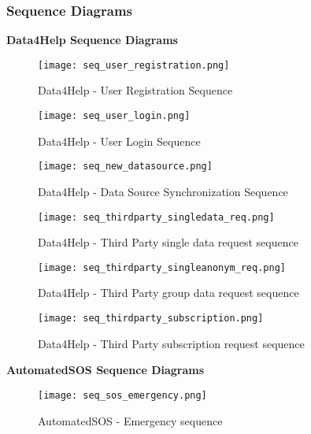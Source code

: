 \graphicspath{ {../Diagrams/} }


\subsubsection{Sequence Diagrams}
\textbf{Data4Help Sequence Diagrams}
\begin{figure}[H]
	\texttt{[image: seq\_user\_registration.png]}
	\caption{Data4Help - User Registration Sequence}
	\label{Data4Help - User Registration Sequence}
\end{figure}

\begin{figure}
	\texttt{[image: seq\_user\_login.png]}
	\caption{Data4Help - User Login Sequence}
	\label{Data4Help - User Login Sequence}
\end{figure}

\begin{figure}
	\texttt{[image: seq\_new\_datasource.png]}
	\caption{Data4Help - Data Source Synchronization Sequence}
	\label{Data4Help - Data Source Synchronization Sequence}
\end{figure}                                           

\begin{figure}
	\texttt{[image: seq\_thirdparty\_singledata\_req.png]}
	\caption{Data4Help - Third Party single data request sequence}
	\label{Data4Help - Third Party single data request sequence}
\end{figure}

\begin{figure}
	\texttt{[image: seq\_thirdparty\_singleanonym\_req.png]}
	\caption{Data4Help - Third Party group data request sequence}
	\label{Data4Help - Third Party group data request sequence}
\end{figure}  

\begin{figure}
	\texttt{[image: seq\_thirdparty\_subscription.png]}
	\caption{Data4Help - Third Party subscription request sequence}
	\label{Data4Help - Third Party subscription request sequence}
\end{figure}

\FloatBarrier
\textbf{AutomatedSOS Sequence Diagrams}

\begin{figure}[H]
	\texttt{[image: seq\_sos\_emergency.png]}
	\caption{AutomatedSOS - Emergency sequence}
	\label{AutomatedSOS - Emergency sequence}
\end{figure}                

